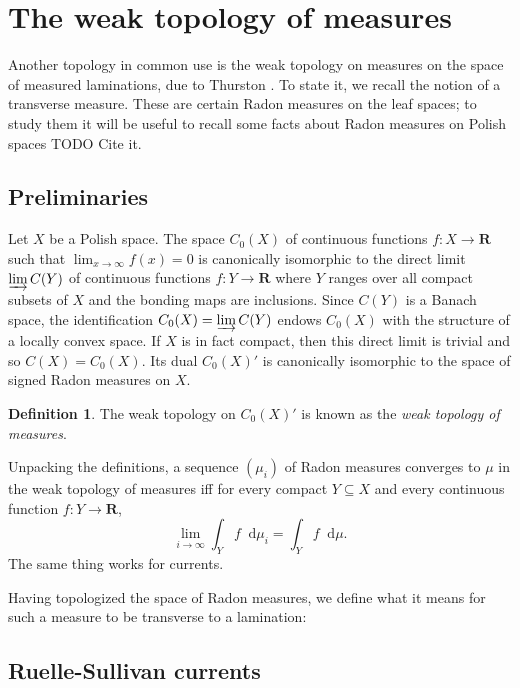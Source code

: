 \documentclass[reqno,11pt]{amsart}
\newcommand{\RR}{\mathbf{R}}
\newcommand*\dif{\mathop{}\!\mathrm{d}}
\newcommand{\dfn}[1]{\emph{#1}\index{#1}}
\theoremstyle{definition}
\newtheorem{definition}[theorem]{Definition}
\numberwithin{equation}{section}
\begin{document}

\section{The weak topology of measures}
Another topology in common use is the weak topology on measures on the space of measured laminations, due to Thurston \cite[Chapter 8]{thurston1998minimal}.
To state it, we recall the notion of a transverse measure.
These are certain Radon measures on the leaf spaces; to study them it will be useful to recall some facts about Radon measures on Polish spaces TODO Cite it.

\subsection{Preliminaries}
Let $X$ be a Polish space.
The space $C_0(X)$ of continuous functions $f: X \to \RR$ such that $\lim_{x \to \infty} f(x) = 0$ is canonically isomorphic to the direct limit $\varinjlim C(Y)$ of continuous functions $f: Y \to \RR$ where $Y$ ranges over all compact subsets of $X$ and the bonding maps are inclusions.
Since $C(Y)$ is a Banach space, the identification $C_0(X) = \varinjlim C(Y)$ endows $C_0(X)$ with the structure of a locally convex space.
If $X$ is in fact compact, then this direct limit is trivial and so $C(X) = C_0(X)$.
Its dual $C_0(X)'$ is canonically isomorphic to the space of signed Radon measures on $X$.

\begin{definition}
The weak topology on $C_0(X)'$ is known as the \dfn{weak topology of measures}.
\end{definition}

Unpacking the definitions, a sequence $(\mu_i)$ of Radon measures converges to $\mu$ in the weak topology of measures iff for every compact $Y \subseteq X$ and every continuous function $f: Y \to \RR$,
$$\lim_{i \to \infty} \int_Y f \dif \mu_i = \int_Y f \dif \mu.$$
The same thing works for currents.

Having topologized the space of Radon measures, we define what it means for such a measure to be transverse to a lamination:




\subsection{Ruelle-Sullivan currents}
\end{document}
